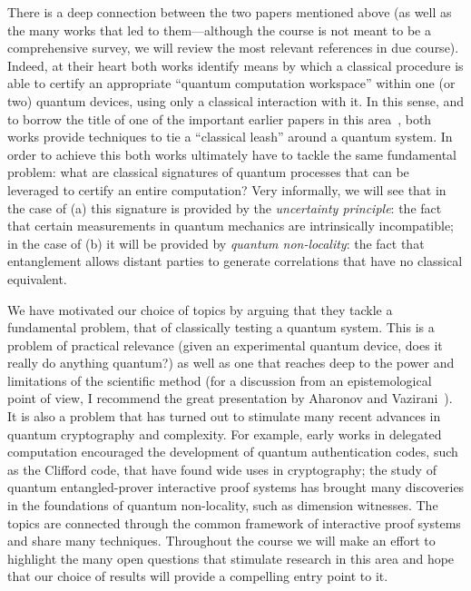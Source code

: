 There is a deep connection between the two papers mentioned above (as well as the many works that led to them---although the course is not meant to be a comprehensive survey, we will review the most relevant references in due course). Indeed, at their heart both works identify means by which a classical procedure is able to certify an appropriate ``quantum computation workspace'' within one (or two) quantum devices, using only a classical interaction with it. In this sense, and to borrow the title of one of the important earlier papers in this area~\cite{reichardt2013classical}, both works provide techniques to tie a ``classical leash'' around a quantum system. In order to achieve this both works ultimately have to tackle the same fundamental problem: what are classical signatures of quantum processes that can be leveraged to certify an entire computation? Very informally, we will see that in the case of (a) this signature is provided by the \emph{uncertainty principle}: the fact that certain measurements in quantum mechanics are intrinsically incompatible; in the case of (b) it will be provided by \emph{quantum non-locality}: the fact that entanglement allows distant parties to generate correlations that have no classical equivalent.

We have motivated our choice of topics by arguing that they tackle a fundamental problem, that of classically testing a quantum system. This is a problem of practical relevance (given an experimental quantum device, does it really do anything quantum?) as well as one that reaches deep to the power and limitations of the scientific method (for a discussion from an epistemological point of view, I recommend the great presentation by Aharonov and Vazirani~\cite{aharonov2012quantum}). It is also a problem that has turned out to stimulate many recent advances in quantum cryptography and complexity. For example, early works in delegated computation encouraged the development of quantum authentication codes, such as the Clifford code, that have found wide uses in cryptography; the study of quantum entangled-prover interactive proof systems has brought many discoveries in the foundations of quantum non-locality, such as dimension witnesses. The topics are connected through the common framework of interactive proof systems and share many techniques. Throughout the course we will make an effort to highlight the many open questions that stimulate research in this area and hope that our choice of results will provide a compelling entry point to it.

\medskip

